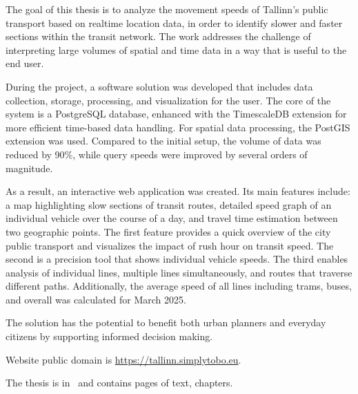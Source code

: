 The goal of this thesis is to analyze the movement speeds of Tallinn's public transport based on realtime location data, in order to identify slower and faster sections within the transit network. The work addresses the challenge of interpreting large volumes of spatial and time data in a way that is useful to the end user.

During the project, a software solution was developed that includes data collection, storage, processing, and visualization for the user. The core of the system is a PostgreSQL database, enhanced with the TimescaleDB extension for more efficient time-based data handling. For spatial data processing, the PostGIS extension was used. Compared to the initial setup, the volume of data was reduced by 90\%, while query speeds were improved by several orders of magnitude.

As a result, an interactive web application was created. Its main features include: a map highlighting slow sections of transit routes, detailed speed graph of an individual vehicle over the course of a day, and travel time estimation between two geographic points. The first feature provides a quick overview of the city public transport and visualizes the impact of rush hour on transit speed. The second is a precision tool that shows individual vehicle speeds. The third enables analysis of individual lines, multiple lines simultaneously, and routes that traverse different paths. Additionally, the average speed of all lines including trams, buses, and overall was calculated for March 2025.

The solution has the potential to benefit both urban planners and everyday citizens by supporting informed decision making.

Website public domain is \url{https://tallinn.simplytobo.eu}.

The thesis is in \langEng~and contains \calculatepages pages of text, 
 chapters.